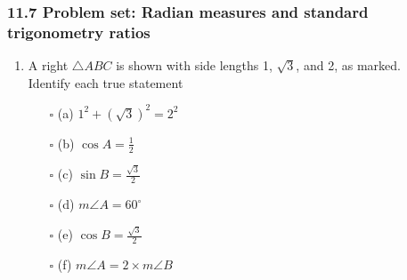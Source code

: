 \documentclass[12pt, twoside]{article}
\begin{document}
\subsubsection*{11.7 Problem set: Radian measures and standard trigonometry ratios}

\begin{enumerate}

  \item A right $\triangle ABC$ is shown with side lengths 1, $\sqrt{3}$, and 2, as marked. \\[0.2cm]
  Identify each true statement%
  \begin{multicols}{2}
    \begin{enumerate}[itemsep=0.4cm]
      \item[$\square$ (a)] $\displaystyle 1^2 + (\sqrt{3})^2 = 2^2$
      \item[$\square$ (b)] $\displaystyle \cos A=\frac{1}{2}$
      \item[$\square$ (c)] $\displaystyle \sin B= \frac{\sqrt{3}}{2}$
      \item[$\square$ (d)] $m\angle A = 60^\circ$
      \item[$\square$ (e)] $\displaystyle \cos B= \frac{\sqrt{3}}{2}$
      \item[$\square$ (f)] $m\angle A = 2 \times m\angle B$
      \end{enumerate}
    \end{multicols} %


\end{enumerate}
\end{document}

